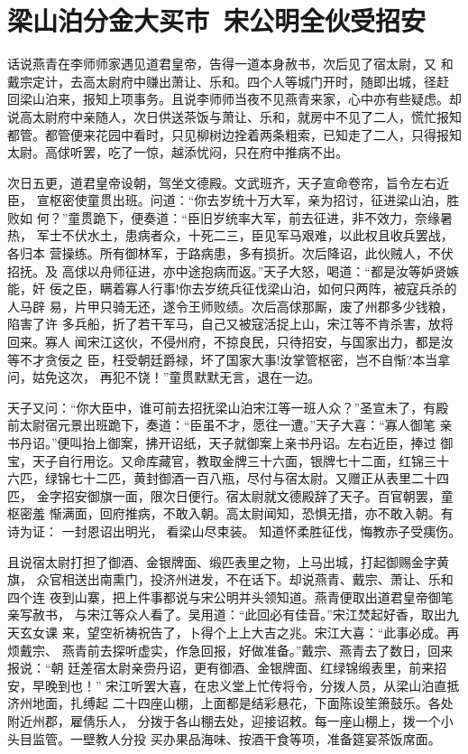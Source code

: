 \chapter{梁山泊分金大买市~宋公明全伙受招安}

话说燕青在李师师家遇见道君皇帝，告得一道本身赦书，次后见了宿太尉，又
和戴宗定计，去高太尉府中赚出萧让、乐和。四个人等城门开时，随即出城，径赶
回梁山泊来，报知上项事务。且说李师师当夜不见燕青来家，心中亦有些疑虑。却
说高太尉府中亲随人，次日供送茶饭与萧让、乐和，就房中不见了二人，慌忙报知
都管。都管便来花园中看时，只见柳树边拴着两条粗索，已知走了二人，只得报知
太尉。高俅听罢，吃了一惊，越添忧闷，只在府中推病不出。

次日五更，道君皇帝设朝，驾坐文德殿。文武班齐，天子宣命卷帘，旨令左右近臣，
宣枢密使童贯出班。问道：“你去岁统十万大军，亲为招讨，征进梁山泊，胜败如
何？”童贯跪下，便奏道：“臣旧岁统率大军，前去征进，非不效力，奈缘暑热，
军士不伏水土，患病者众，十死二三，臣见军马艰难，以此权且收兵罢战，各归本
营操练。所有御林军，于路病患，多有损折。次后降诏，此伙贼人，不伏招抚。及
高俅以舟师征进，亦中途抱病而返。”天子大怒，喝道：“都是汝等妒贤嫉能，奸
佞之臣，瞒着寡人行事!你去岁统兵征伐梁山泊，如何只两阵，被寇兵杀的人马辟
易，片甲只骑无还，遂令王师败绩。次后高俅那厮，废了州郡多少钱粮，陷害了许
多兵船，折了若干军马，自己又被寇活捉上山，宋江等不肯杀害，放将回来。寡人
闻宋江这伙，不侵州府，不掠良民，只待招安，与国家出力，都是汝等不才贪佞之
臣，枉受朝廷爵禄，坏了国家大事!汝掌管枢密，岂不自惭?本当拿问，姑免这次，
再犯不饶！”童贯默默无言，退在一边。

天子又问：“你大臣中，谁可前去招抚梁山泊宋江等一班人众？”圣宣未了，有殿
前太尉宿元景出班跪下，奏道：“臣虽不才，愿往一遭。”天子大喜：“寡人御笔
亲书丹诏。”便叫抬上御案，拂开诏纸，天子就御案上亲书丹诏。左右近臣，捧过
御宝，天子自行用讫。又命库藏官，教取金牌三十六面，银牌七十二面，红锦三十
六匹，绿锦七十二匹，黄封御酒一百八瓶，尽付与宿太尉。又赠正从表里二十四匹，
金字招安御旗一面，限次日便行。宿太尉就文德殿辞了天子。百官朝罢，童枢密羞
惭满面，回府推病，不敢入朝。高太尉闻知，恐惧无措，亦不敢入朝。有诗为证：
一封恩诏出明光，看梁山尽束装。
知道怀柔胜征伐，悔教赤子受痍伤。

且说宿太尉打担了御酒、金银牌面、缎匹表里之物，上马出城，打起御赐金字黄旗，
众官相送出南熏门，投济州进发，不在话下。却说燕青、戴宗、萧让、乐和四个连
夜到山寨，把上件事都说与宋公明并头领知道。燕青便取出道君皇帝御笔亲写赦书，
与宋江等众人看了。吴用道：“此回必有佳音。”宋江焚起好香，取出九天玄女课
来，望空祈祷祝告了，卜得个上上大吉之兆。宋江大喜：“此事必成。再烦戴宗、
燕青前去探听虚实，作急回报，好做准备。”戴宗、燕青去了数日，回来报说：“朝
廷差宿太尉亲赍丹诏，更有御酒、金银牌面、红绿锦缎表里，前来招安，早晚到也！”
宋江听罢大喜，在忠义堂上忙传将令，分拨人员，从梁山泊直抵济州地面，扎缚起
二十四座山棚，上面都是结彩悬花，下面陈设笙箫鼓乐。各处附近州郡，雇倩乐人，
分拨于各山棚去处，迎接诏敕。每一座山棚上，拨一个小头目监管。一壁教人分投
买办果品海味、按酒干食等项，准备筵宴茶饭席面。

